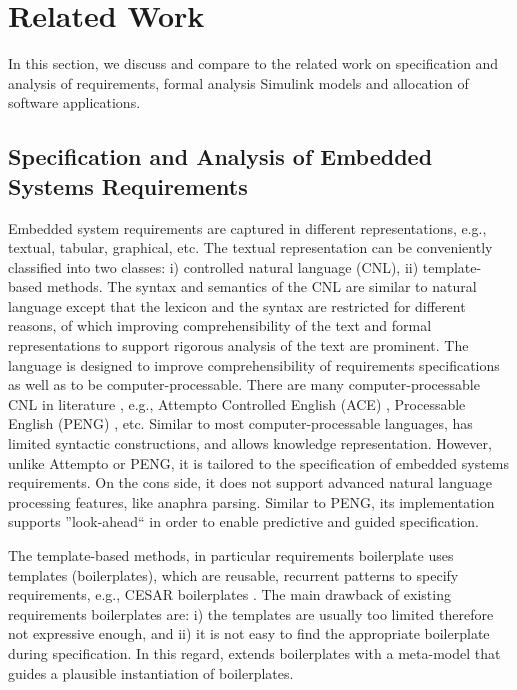 \chapter{Related Work}
In this section, we discuss and compare to the related work on specification and analysis of requirements, formal analysis Simulink models and allocation of software applications.

\section{Specification and Analysis of Embedded Systems Requirements}
Embedded system requirements are captured in different representations, e.g., textual, tabular, graphical, etc. The textual representation can be conveniently classified into two classes: i) controlled natural language (CNL), ii) template-based methods.  The syntax and semantics of the CNL are similar to natural language except that the lexicon and the syntax are restricted for different reasons, of which improving comprehensibility of the text and formal representations to support rigorous analysis of the text are prominent. The \resa{} language is designed to improve comprehensibility of requirements specifications as well as to be computer-processable. There are many computer-processable CNL in literature \cite{Kuhn2014ALanguages}, e.g., Attempto Controlled English (ACE) \cite{attempto96}, Processable English (PENG) \cite{Schwitter2002EnglishLanguage}, etc. Similar to most computer-processable languages, \resa{} has limited syntactic constructions, and allows knowledge representation. However, unlike Attempto or PENG, it is tailored to the specification of embedded systems requirements.  On the cons side, it does not support advanced natural language processing features, like anaphra parsing. Similar to PENG, its implementation supports ''look-ahead`` in order to enable predictive and guided specification.

The template-based methods, in particular requirements boilerplate uses templates (boilerplates), which are reusable, recurrent patterns to specify requirements, e.g., CESAR boilerplates \cite{Farfeleder2011DODT:Development}. The main drawback of existing requirements boilerplates are: i) the templates are usually too limited therefore not expressive enough, and ii) it is not easy to find the appropriate boilerplate during specification. In this regard, \resa{} extends boilerplates with a meta-model that guides a plausible instantiation of boilerplates.


